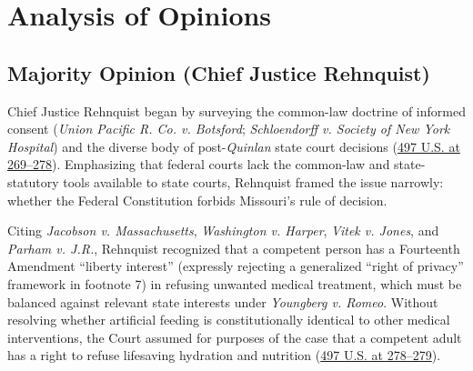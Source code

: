 \documentclass[12pt]{article}
\begin{document}
\section{Analysis of Opinions}

\subsection{Majority Opinion (Chief Justice Rehnquist)}

Chief Justice Rehnquist began by surveying the common-law doctrine of informed consent (\textit{Union Pacific R. Co. v. Botsford}; \textit{Schloendorff v. Society of New York Hospital}) and the diverse body of post-\textit{Quinlan} state court decisions (\href{https://supreme.justia.com/cases/federal/us/497/261/}{497 U.S. at 269--278}). Emphasizing that federal courts lack the common-law and state-statutory tools available to state courts, Rehnquist framed the issue narrowly: whether the Federal Constitution forbids Missouri's rule of decision.

Citing \textit{Jacobson v. Massachusetts}, \textit{Washington v. Harper}, \textit{Vitek v. Jones}, and \textit{Parham v. J.R.}, Rehnquist recognized that a competent person has a Fourteenth Amendment ``liberty interest'' (expressly rejecting a generalized ``right of privacy'' framework in footnote 7) in refusing unwanted medical treatment, which must be balanced against relevant state interests under \textit{Youngberg v. Romeo}. Without resolving whether artificial feeding is constitutionally identical to other medical interventions, the Court assumed for purposes of the case that a competent adult has a right to refuse lifesaving hydration and nutrition (\href{https://supreme.justia.com/cases/federal/us/497/261/}{497 U.S. at 278--279}).
\end{document}
